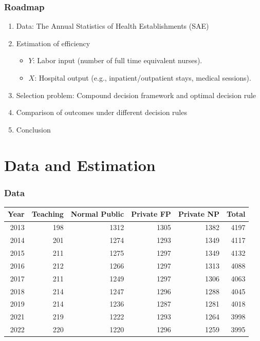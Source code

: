 \documentclass[10pt,mathserif]{beamer}
\begin{document}
\begin{frame}
  \frametitle{Roadmap}
  \begin{enumerate}\itemsep=12pt
    \item Data: The Annual Statistics of Health Establishments (SAE)
    \item Estimation of efficiency
          \begin{itemize} \itemsep=6pt
            \item $Y$: Labor input (number of full time equivalent nurses).
            \item $X$: Hospital output (e.g., inpatient/outpatient stays, medical sessions).
          \end{itemize}
    \item Selection problem: Compound decision framework and optimal decision rule
    \item Comparison of outcomes under different decision rules
    \item Conclusion
  \end{enumerate}
\end{frame}

\section{Data and Estimation}

\begin{frame}
  \frametitle{Data}
  \begin{table}
    \fontsize{10pt}{10pt}\selectfont
    \begin{tabular}{rrrrrr}
      \toprule
      Year & Teaching & Normal Public & Private FP & Private NP & Total \\
      \midrule
      2013 & 198      & 1312          & 1305       & 1382       & 4197  \\
      2014 & 201      & 1274          & 1293       & 1349       & 4117  \\
      2015 & 211      & 1275          & 1297       & 1349       & 4132  \\
      2016 & 212      & 1266          & 1297       & 1313       & 4088  \\
      2017 & 211      & 1249          & 1297       & 1306       & 4063  \\
      2018 & 214      & 1247          & 1296       & 1288       & 4045  \\
      2019 & 214      & 1236          & 1287       & 1281       & 4018  \\
      2021 & 219      & 1222          & 1293       & 1264       & 3998  \\
      2022 & 220      & 1220          & 1296       & 1259       & 3995  \\
      \bottomrule
    \end{tabular}
  \end{table}
\end{frame}
\end{document}
